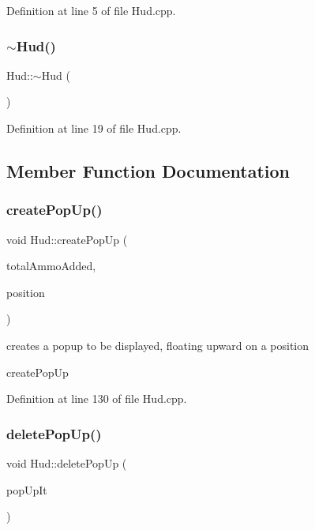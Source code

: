 Definition at line 5 of file Hud.\+cpp.

\mbox{\label{class_hud_a2fbb662bbc70f646e081f9206a879b66}} 
\subsubsection{\texorpdfstring{$\sim$\+Hud()}{~Hud()}}
{\footnotesize\ttfamily Hud\+::$\sim$\+Hud (\begin{DoxyParamCaption}{ }\end{DoxyParamCaption})}



Definition at line 19 of file Hud.\+cpp.



\subsection{Member Function Documentation}
\mbox{\label{class_hud_accfaddbefc4b7ba1ecf64d3b32af2d24}} 
\subsubsection{\texorpdfstring{create\+Pop\+Up()}{createPopUp()}}
{\footnotesize\ttfamily void Hud\+::create\+Pop\+Up (\begin{DoxyParamCaption}\item[{int}]{total\+Ammo\+Added,  }\item[{Vector2f}]{position }\end{DoxyParamCaption})}



creates a popup to be displayed, floating upward on a position 

create\+Pop\+Up 

Definition at line 130 of file Hud.\+cpp.

\mbox{\label{class_hud_a6c8effbe343872e65e9d02f0509be0d6}} 
\subsubsection{\texorpdfstring{delete\+Pop\+Up()}{deletePopUp()}}
{\footnotesize\ttfamily void Hud\+::delete\+Pop\+Up (\begin{DoxyParamCaption}\item[{std\+::vector$<$ Pop\+Up $\ast$$>$\+::iterator \&}]{pop\+Up\+It }\end{DoxyParamCaption})}



